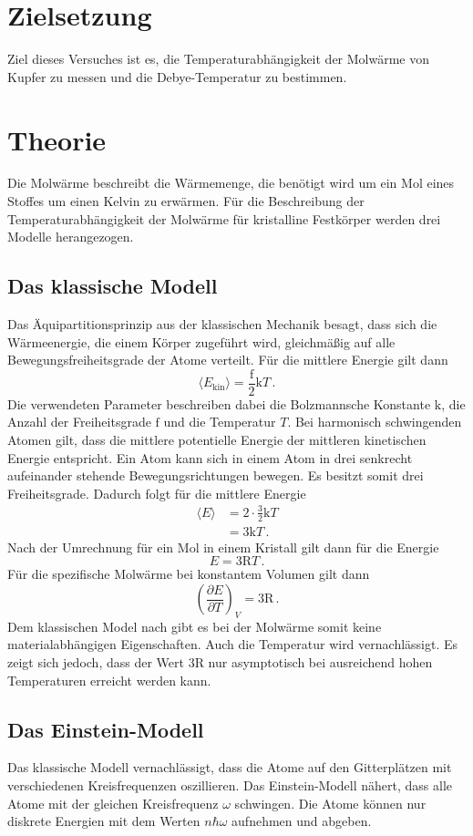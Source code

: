 \section{Zielsetzung}
Ziel dieses Versuches ist es, die Temperaturabhängigkeit der Molwärme von Kupfer
zu messen und die Debye-Temperatur zu bestimmen.
\section{Theorie}
Die Molwärme beschreibt die Wärmemenge, die benötigt wird um ein Mol eines
Stoffes um einen Kelvin zu erwärmen. Für die Beschreibung der
Temperaturabhängigkeit der Molwärme für kristalline Festkörper
werden drei Modelle herangezogen.

\subsection{Das klassische Modell}
Das Äquipartitionsprinzip aus der klassischen Mechanik besagt, dass sich die
Wärmeenergie, die einem Körper zugeführt wird, gleichmäßig auf alle
Bewegungsfreiheitsgrade der Atome verteilt. Für die mittlere Energie gilt dann
\begin{equation}
  \langle E_{\text{kin}} \rangle = \frac{\text{f}}{2} \text{k} T \, .
\end{equation}
Die verwendeten Parameter beschreiben dabei die Bolzmannsche Konstante
$\text{k}$, die Anzahl der Freiheitsgrade $\text{f}$ und die Temperatur $T$. Bei
harmonisch schwingenden Atomen gilt, dass die mittlere potentielle Energie
der mittleren kinetischen Energie entspricht. Ein Atom kann sich in einem
Atom in drei senkrecht aufeinander stehende Bewegungsrichtungen bewegen. Es
besitzt somit drei Freiheitsgrade. Dadurch folgt für die mittlere Energie
\begin{align*}
  \langle E \rangle &= 2 \cdot \frac{3}{2} \text{k} T \\
                    &= 3 \text{k} T  \, .
\end{align*}
Nach der Umrechnung für ein Mol in einem Kristall gilt dann für die Energie
\begin{equation}
  E = 3 \text{R} T \, .
\end{equation}
Für die spezifische Molwärme bei konstantem Volumen gilt dann
\begin{equation}
  \left(\frac{\partial E}{\partial T}\right)_{\!\! V} = 3 \text{R} \, .
\end{equation}
Dem klassischen Model nach gibt es bei der Molwärme somit keine
materialabhängigen Eigenschaften. Auch die Temperatur wird vernachlässigt.
Es zeigt sich jedoch, dass der Wert $3 \text{R}$ nur asymptotisch bei
ausreichend hohen Temperaturen erreicht werden kann.

\subsection{Das Einstein-Modell}
Das klassische Modell vernachlässigt, dass die Atome auf den Gitterplätzen
mit verschiedenen Kreisfrequenzen oszillieren. Das Einstein-Modell nähert,
dass alle Atome mit der gleichen Kreisfrequenz $\omega$ schwingen. Die Atome
können nur diskrete Energien mit dem Werten $n \hbar \omega$ aufnehmen und
abgeben.
